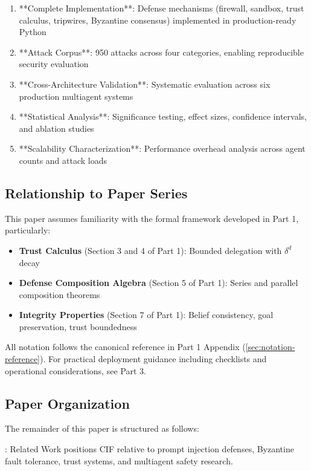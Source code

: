 \documentclass[
]{article}
\providecommand{\tightlist}{%
  \setlength{\itemsep}{0pt}\setlength{\parskip}{0pt}}
\begin{document}
\begin{enumerate}
\item **Complete Implementation**: Defense mechanisms (firewall, sandbox, trust calculus, tripwires, Byzantine consensus) implemented in production-ready Python
\item **Attack Corpus**: 950 attacks across four categories, enabling reproducible security evaluation
\item **Cross-Architecture Validation**: Systematic evaluation across six production multiagent systems
\item **Statistical Analysis**: Significance testing, effect sizes, confidence intervals, and ablation studies
\item **Scalability Characterization**: Performance overhead analysis across agent counts and attack loads
\end{enumerate}

\subsection{Relationship to Paper
Series}\label{relationship-to-paper-series}

This paper assumes familiarity with the formal framework developed in
Part 1, particularly:

\begin{itemize}
\tightlist
\item
  \textbf{Trust Calculus} (Section 3 and 4 of Part 1): Bounded
  delegation with \(\delta^d\) decay
\item
  \textbf{Defense Composition Algebra} (Section 5 of Part 1): Series and
  parallel composition theorems
\item
  \textbf{Integrity Properties} (Section 7 of Part 1): Belief
  consistency, goal preservation, trust boundedness
\end{itemize}

All notation follows the canonical reference in Part 1 Appendix
(\cref{sec:notation-reference}). For practical deployment guidance
including checklists and operational considerations, see Part 3.

\subsection{Paper Organization}\label{paper-organization}

The remainder of this paper is structured as follows:

\textbf{}: Related Work positions CIF relative to
prompt injection defenses, Byzantine fault tolerance, trust systems, and
multiagent safety research.
\end{document}
